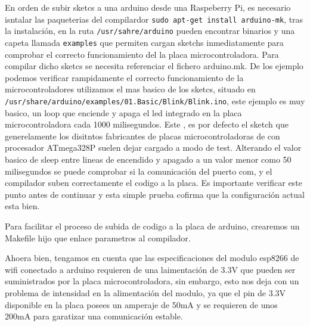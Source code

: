 En orden de subir sketcs a una arduino desde una Raspeberry Pi, es necesario isntalar las paqueterias del compilardor \verb|sudo apt-get install arduino-mk|, tras la instalación, en la ruta \verb|/usr/sahre/arduino| pueden encontrar binarios y una capeta llamada \verb|examples| que permiten cargan sketchs inmediatamente para comprobar el correcto funcionamiento del la placa microcontroladora. Para compilar dicho sketcs se necesita referenciar el fichero arduino.mk. De los ejemplo podemos verificar rampidamente el correcto funcionamiento de la microcontroladores utilizamos el mas basico de los sketcs, situado en \verb|/usr/share/arduino/examples/01.Basic/Blink/Blink.ino|, este ejemplo es muy basico, un loop que enciende y apaga el led integrado en la placa microcontroladora cada 1000 milisegundos. Este , es por defecto el sketch que generelamente los disitntos fabricantes de placas microcontroladoras de con procesador ATmega328P suelen dejar cargado a modo de test. Alterando el valor basico de sleep entre lineas de encendido y apagado a un valor menor como 50 milisegundos se puede comprobar si la comunicación del puerto com, y el compilador suben correctamente el codigo a la placa. Es importante verificar este punto antes de continuar y esta simple prueba cofirma que la configuración actual esta bien.

Para facilitar el proceso de subida de codigo a la placa de arduino, crearemos un Makefile hijo que enlace parametros al compilador.


Ahoera bien, tengamos en cuenta que las especificaciones del modulo esp8266 de wifi conectado a arduino requieren de una laimentación de 3.3V que pueden ser suministrados por la placa microcontroladora, sin embargo, esto nos deja con un problema de intensidad en la alimentación del modulo, ya que el pin de 3.3V disponible en la placa posees un amperaje de 50mA y se requieren de unos 200mA para garatizar una comunicación estable.
